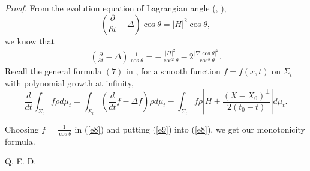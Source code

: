 {\it Proof.} From  the evolution equation of Lagrangian angle
(\cite{Sm1}, \cite{Sm2}),
\begin{equation}\label{e3}(\frac{\partial}{\partial
t}-\Delta)\cos\theta=|H|^2\cos\theta,\end{equation} we know that
\begin{eqnarray}\label{e9}
(\frac{\partial}{\partial
t}-\Delta)\frac{1}{\cos\theta}=-\frac{|H|^2}{\cos^2\theta}
-2\frac{|\nabla\cos\theta|^2}{\cos^3\theta}.
\end{eqnarray} Recall the general formula $(7)$ in
\cite{EH}, for a smooth function $f=f(x, t)$ on $\Sigma_t$ with
polynomial growth at infinity,
\begin{equation}\label{e8}
\frac{d}{dt}\int_{\Sigma_t}f\rho d\mu_t= \int_{\Sigma_t}
(\frac{d}{dt}f-\Delta f)\rho d\mu_t-\int_{\Sigma_t}f\rho
\left|H+\frac{(X-X_0)^\perp}{2(t_0-t)}\right|d\mu_t.
\end{equation}

Choosing $f=\frac{1}{\cos\theta}$ in (\ref{e8}) and putting
(\ref{e9}) into (\ref{e8}), we get our monotonicity formula.

\hfill Q. E. D.

\vspace{.1in}

